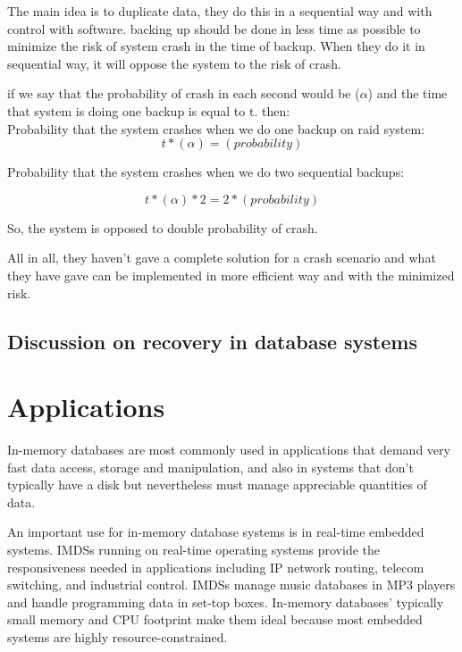 \documentclass[12pt]{article} %
\begin{document}
The main idea is to duplicate data, they do this in a sequential way and with control with software. backing up should be done in less time as possible to minimize the risk of system crash in the time of backup. When they do it in sequential way, it will oppose the system to the risk of crash.

if we say that the probability of crash in each second would be ($\alpha$) and the time that system is doing one backup is equal to t. then:\\

Probability that the system crashes when we do one backup on raid system:
\begin{equation}
 t*(\alpha) = (probability)
\end{equation}

Probability that the system crashes when we do two sequential backups:

\begin{equation}
 t*(\alpha)*2 = 2*(probability)
\end{equation}

So, the system is opposed to double probability of crash.

All in all, they haven’t gave a complete solution for a crash scenario and what they have gave can be implemented in more efficient way and with the minimized risk.

\subsection{ Discussion on recovery in database systems}



\section{Applications}

In-memory databases are most commonly used in applications that demand very fast data access, storage and manipulation, and also in systems that don’t typically have a disk but nevertheless must manage appreciable quantities of data.

An important use for in-memory database systems is in real-time embedded systems. IMDSs running on real-time operating systems provide the responsiveness needed in applications including IP network routing, telecom switching, and industrial control. IMDSs manage music databases in MP3 players and handle programming data in set-top boxes. In-memory databases’ typically small memory and CPU footprint make them ideal because most embedded systems are highly resource-constrained.
\end{document}
